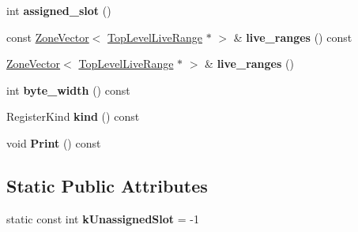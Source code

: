 \begin{DoxyCompactItemize}
\item 
int {\bfseries assigned\+\_\+slot} ()\hypertarget{classv8_1_1internal_1_1compiler_1_1_spill_range_a8d3ffbfdb3f55f69f3bb244d463404bc}{}\label{classv8_1_1internal_1_1compiler_1_1_spill_range_a8d3ffbfdb3f55f69f3bb244d463404bc}

\item 
const \hyperlink{classv8_1_1internal_1_1_zone_vector}{Zone\+Vector}$<$ \hyperlink{classv8_1_1internal_1_1compiler_1_1_top_level_live_range}{Top\+Level\+Live\+Range} $\ast$ $>$ \& {\bfseries live\+\_\+ranges} () const \hypertarget{classv8_1_1internal_1_1compiler_1_1_spill_range_a6e57dfb997f4f13e3a52a18ad835ebb8}{}\label{classv8_1_1internal_1_1compiler_1_1_spill_range_a6e57dfb997f4f13e3a52a18ad835ebb8}

\item 
\hyperlink{classv8_1_1internal_1_1_zone_vector}{Zone\+Vector}$<$ \hyperlink{classv8_1_1internal_1_1compiler_1_1_top_level_live_range}{Top\+Level\+Live\+Range} $\ast$ $>$ \& {\bfseries live\+\_\+ranges} ()\hypertarget{classv8_1_1internal_1_1compiler_1_1_spill_range_a3265eaffe21a3c1b2665b587efe079a8}{}\label{classv8_1_1internal_1_1compiler_1_1_spill_range_a3265eaffe21a3c1b2665b587efe079a8}

\item 
int {\bfseries byte\+\_\+width} () const \hypertarget{classv8_1_1internal_1_1compiler_1_1_spill_range_aa8c37e5f42b50f74bd4a592c084bea29}{}\label{classv8_1_1internal_1_1compiler_1_1_spill_range_aa8c37e5f42b50f74bd4a592c084bea29}

\item 
Register\+Kind {\bfseries kind} () const \hypertarget{classv8_1_1internal_1_1compiler_1_1_spill_range_a675a4883bec90810ece87dc006eb5ba8}{}\label{classv8_1_1internal_1_1compiler_1_1_spill_range_a675a4883bec90810ece87dc006eb5ba8}

\item 
void {\bfseries Print} () const \hypertarget{classv8_1_1internal_1_1compiler_1_1_spill_range_a8e79978dcbda2c72d15498126a46898f}{}\label{classv8_1_1internal_1_1compiler_1_1_spill_range_a8e79978dcbda2c72d15498126a46898f}

\end{DoxyCompactItemize}
\subsection*{Static Public Attributes}
\begin{DoxyCompactItemize}
\item 
static const int {\bfseries k\+Unassigned\+Slot} = -\/1\hypertarget{classv8_1_1internal_1_1compiler_1_1_spill_range_a65b6e208d6e983bf6d27510bf4f4ae63}{}\label{classv8_1_1internal_1_1compiler_1_1_spill_range_a65b6e208d6e983bf6d27510bf4f4ae63}

\end{DoxyCompactItemize}
